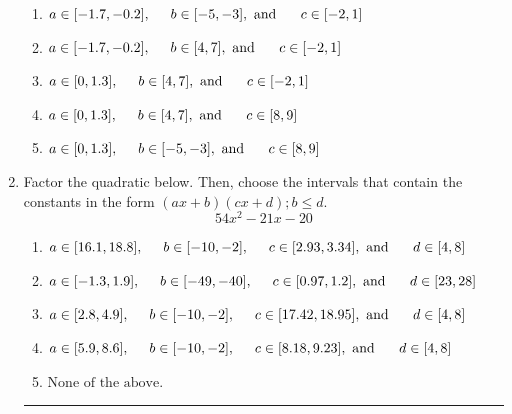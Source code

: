 \documentclass[14pt]{extbook}
\newcommand{\litem}[1]{\item#1\hspace*{-1cm}\rule{\textwidth}{0.4pt}}
\begin{document}
\begin{enumerate}
{\begin{center}
\end{center}
\begin{enumerate}[label=\Alph*.]
\item \( a \in [-1.7, -0.2], \hspace*{5mm} b \in [-5, -3], \text{ and } \hspace*{5mm} c \in [-2, 1] \)
\item \( a \in [-1.7, -0.2], \hspace*{5mm} b \in [4, 7], \text{ and } \hspace*{5mm} c \in [-2, 1] \)
\item \( a \in [0, 1.3], \hspace*{5mm} b \in [4, 7], \text{ and } \hspace*{5mm} c \in [-2, 1] \)
\item \( a \in [0, 1.3], \hspace*{5mm} b \in [4, 7], \text{ and } \hspace*{5mm} c \in [8, 9] \)
\item \( a \in [0, 1.3], \hspace*{5mm} b \in [-5, -3], \text{ and } \hspace*{5mm} c \in [8, 9] \)

\end{enumerate} }
\litem{
Factor the quadratic below. Then, choose the intervals that contain the constants in the form $(ax+b)(cx+d); b \leq d.$\[ 54x^{2} -21 x -20 \]\begin{enumerate}[label=\Alph*.]
\item \( a \in [16.1, 18.8], \hspace*{5mm} b \in [-10, -2], \hspace*{5mm} c \in [2.93, 3.34], \text{ and } \hspace*{5mm} d \in [4, 8] \)
\item \( a \in [-1.3, 1.9], \hspace*{5mm} b \in [-49, -40], \hspace*{5mm} c \in [0.97, 1.2], \text{ and } \hspace*{5mm} d \in [23, 28] \)
\item \( a \in [2.8, 4.9], \hspace*{5mm} b \in [-10, -2], \hspace*{5mm} c \in [17.42, 18.95], \text{ and } \hspace*{5mm} d \in [4, 8] \)
\item \( a \in [5.9, 8.6], \hspace*{5mm} b \in [-10, -2], \hspace*{5mm} c \in [8.18, 9.23], \text{ and } \hspace*{5mm} d \in [4, 8] \)
\item \( \text{None of the above.} \)


\end{enumerate}}
\end{enumerate}
\end{document}
